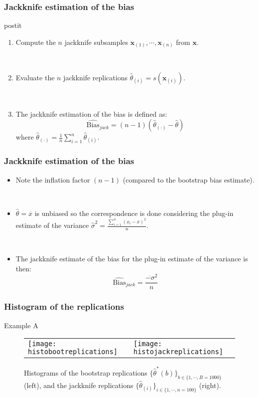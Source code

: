 \frame
{
\frametitle{Jackknife estimation of the bias}


\begin{beamercolorbox}[wd=\linewidth, rounded=true,shadow=true]{postit}
\begin{enumerate}
\item Compute the $n$ jackknife subsamples $\mathbf{x}_{(1)}, \cdots,\mathbf{x}_{(n)}$ from $\mathbf{x}$.

\

\item Evaluate the $n$ jackknife replications $\hat{\theta}_{(i)}=s(\mathbf{x}_{(i)})$.

\

\item The \alert{jackknife estimation of the bias} is defined as:
$$
\widehat{\mathrm{Bias}}_{jack}=(n-1)(\hat{\theta}_{(\cdot)}-\hat{\theta})
$$
where $\hat{\theta}_{(\cdot)}=\frac{1}{n}\sum_{i=1}^{n} \hat{\theta}_{(i)}$. 

\end{enumerate}

\end{beamercolorbox}
}
\frame
{
\frametitle{Jackknife estimation of the bias}

\begin{itemize}
\item Note the inflation factor $(n-1)$ (compared to the bootstrap bias estimate).

\

\item $\hat{\theta}=\overline{x}$ is unbiased so the correspondence is done considering the plug-in estimate of the variance $\hat{\sigma}^2=\frac{\sum_{i=1}^n (x_i-\overline{x})^2}{n}$. 

\

\item The jackknife estimate of the bias for the plug-in estimate of the variance is then:
$$    
\widehat{\mathrm{Bias}}_{jack}=\frac{\overline{-\sigma}^2}{n}
$$
\end{itemize}
}
\frame
{
\frametitle{Histogram of the replications} 

\begin{exampleblock}{Example A}
\begin{figure}[!h]
\begin{tabular}{p{5cm}p{5cm}}
\texttt{[image: histobootreplications]}&
\texttt{[image: histojackreplications]}\\
\end{tabular}
\caption{Histograms of the bootstrap replications $\lbrace \hat{\theta}^{*}(b)\rbrace_{b\in \lbrace 1,\cdots,B=1000 \rbrace}$ (left), and the jackknife replications $\lbrace \hat{\theta}_(i)\rbrace_{i\in \lbrace 1,\cdots,n=100 \rbrace}$ (right).}
\end{figure}
\end{exampleblock}
}
